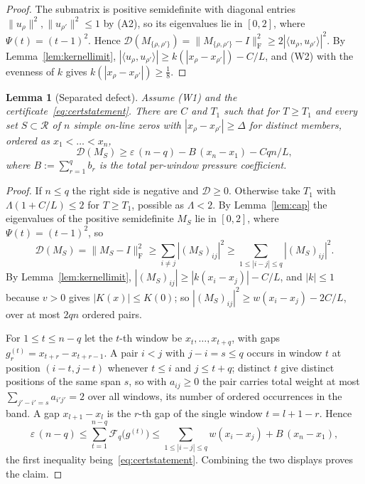 \documentclass[11pt]{article}
\newtheorem{lemma}[theorem]{Lemma}
\theoremstyle{definition}
\newcommand{\F}{\mathrm{F}}
\newcommand{\Fr}{\mathcal{F}}
\newcommand{\cR}{\mathcal{R}}
\newcommand{\eps}{\varepsilon}
\begin{document}
\begin{proof}
The submatrix is positive semidefinite with diagonal entries
$\|u_\rho\|^2,\|u_{\rho'}\|^2\le1$ by (A2), so its eigenvalues lie in $[0,2]$,
where $\Psi(t)=(t-1)^2$. Hence
$\mathcal D(M_{\{\rho,\rho'\}})=\|M_{\{\rho,\rho'\}}-I\|_{\F}^2
\ge2|\langle u_\rho,u_{\rho'}\rangle|^2$. By Lemma~\ref{lem:kernellimit},
$|\langle u_\rho,u_{\rho'}\rangle|\ge k(|x_\rho-x_{\rho'}|)-C/L$, and (W2)
with the evenness of $k$ gives $k(|x_\rho-x_{\rho'}|)\ge\tfrac18$.
\end{proof}

\begin{lemma}[Separated defect]\label{lem:sepdefect}
Assume (W1) and the certificate~\eqref{eq:certstatement}. There are $C$ and
$T_1$ such that for $T\ge T_1$ and every set $S\subset\cR$ of $n$ simple
on-line zeros with $|x_\rho-x_{\rho'}|\ge\Delta$ for distinct members, ordered
as $x_1<\dots<x_n$,
\[
  \mathcal D(M_S)\ge\eps\,(n-q)-B\,(x_n-x_1)-Cqn/L,
\]
where $B:=\sum_{r=1}^qb_r$ is the total per-window pressure coefficient.
\end{lemma}

\begin{proof}
If $n\le q$ the right side is negative and $\mathcal D\ge0$. Otherwise take
$T_1$ with $\Lambda(1+C/L)\le2$ for $T\ge T_1$, possible as $\Lambda<2$. By
Lemma~\ref{lem:cap} the eigenvalues of the positive semidefinite $M_S$ lie in
$[0,2]$, where $\Psi(t)=(t-1)^2$, so
\[
  \mathcal D(M_S)=\|M_S-I\|_{\F}^2\ge\sum_{i\ne j}|(M_S)_{ij}|^2
  \ge\sum_{1\le|i-j|\le q}|(M_S)_{ij}|^2 .
\]
By Lemma~\ref{lem:kernellimit}, $|(M_S)_{ij}|\ge|k(x_i-x_j)|-C/L$, and
$|k|\le1$ because $v>0$ gives $|K(x)|\le K(0)$; so
$|(M_S)_{ij}|^2\ge w(x_i-x_j)-2C/L$, over at most $2qn$ ordered pairs.

For $1\le t\le n-q$ let the $t$-th window be $x_t,\dots,x_{t+q}$, with gaps
$g^{(t)}_r=x_{t+r}-x_{t+r-1}$. A pair $i<j$ with $j-i=s\le q$ occurs in window
$t$ at position $(i-t,j-t)$ whenever $t\le i$ and $j\le t+q$; distinct $t$
give distinct positions of the same span $s$, so with $a_{ij}\ge0$ the pair
carries total weight at most $\sum_{j'-i'=s}a_{i'j'}=2$ over all windows, its
number of ordered occurrences in the band. A gap $x_{l+1}-x_l$ is the $r$-th
gap of the single window $t=l+1-r$. Hence
\[
  \eps\,(n-q)\le\sum_{t=1}^{n-q}\Fr_q\big(g^{(t)}\big)
  \le\sum_{1\le|i-j|\le q}w(x_i-x_j)+B\,(x_n-x_1),
\]
the first inequality being~\eqref{eq:certstatement}. Combining the two
displays proves the claim.
\end{proof}
\end{document}
